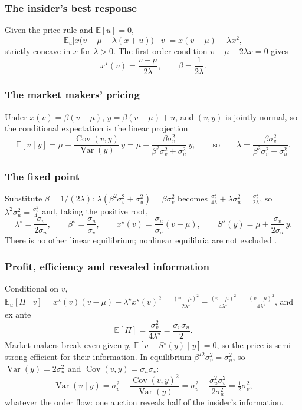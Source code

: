 \subsubsection{The insider's best response}
Given the price rule and $\mathbb{E}[u]=0$,
\[ \mathbb{E}_u\big[x\big(v-\mu-\lambda(x+u)\big)\mid v\big]=x(v-\mu)-\lambda x^2, \]
strictly concave in $x$ for $\lambda>0$. The first-order condition $v-\mu-2\lambda x=0$ gives
\[ x^\star(v)=\frac{v-\mu}{2\lambda},\qquad \beta=\frac{1}{2\lambda}. \]

\subsubsection{The market makers' pricing}
Under $x(v)=\beta(v-\mu)$, $y=\beta(v-\mu)+u$, and $(v,y)$ is jointly normal, so the conditional expectation is the linear projection
\[ \mathbb{E}[v\mid y]=\mu+\frac{\operatorname{Cov}(v,y)}{\operatorname{Var}(y)}\,y=\mu+\frac{\beta\sigma_v^2}{\beta^2\sigma_v^2+\sigma_u^2}\,y,
\qquad\text{so}\qquad \lambda=\frac{\beta\sigma_v^2}{\beta^2\sigma_v^2+\sigma_u^2}. \]

\subsubsection{The fixed point}
Substitute $\beta=1/(2\lambda)$: $\lambda(\beta^2\sigma_v^2+\sigma_u^2)=\beta\sigma_v^2$ becomes $\frac{\sigma_v^2}{4\lambda}+\lambda\sigma_u^2=\frac{\sigma_v^2}{2\lambda}$, so $\lambda^2\sigma_u^2=\frac{\sigma_v^2}{4}$ and, taking the positive root,
\[ \lambda^\star=\frac{\sigma_v}{2\sigma_u},\qquad \beta^\star=\frac{\sigma_u}{\sigma_v},\qquad
x^\star(v)=\frac{\sigma_u}{\sigma_v}(v-\mu),\qquad S^\star(y)=\mu+\frac{\sigma_v}{2\sigma_u}\,y. \]
There is no other linear equilibrium; nonlinear equilibria are not excluded \citep[p.~97]{catalogue-0496}.

\subsubsection{Profit, efficiency and revealed information}
Conditional on $v$, $\mathbb{E}_u[\Pi\mid v]=x^\star(v)(v-\mu)-\lambda^\star x^\star(v)^2=\frac{(v-\mu)^2}{2\lambda^\star}-\frac{(v-\mu)^2}{4\lambda^\star}=\frac{(v-\mu)^2}{4\lambda^\star}$, and ex ante
\[ \mathbb{E}[\Pi]=\frac{\sigma_v^2}{4\lambda^\star}=\frac{\sigma_v\sigma_u}{2}. \]
Market makers break even given $y$, $\mathbb{E}[v-S^\star(y)\mid y]=0$, so the price is semi-strong efficient for their information. In equilibrium $\beta^{\star2}\sigma_v^2=\sigma_u^2$, so $\operatorname{Var}(y)=2\sigma_u^2$ and $\operatorname{Cov}(v,y)=\sigma_u\sigma_v$:
\[ \operatorname{Var}(v\mid y)=\sigma_v^2-\frac{\operatorname{Cov}(v,y)^2}{\operatorname{Var}(y)}=\sigma_v^2-\frac{\sigma_u^2\sigma_v^2}{2\sigma_u^2}=\tfrac12\sigma_v^2, \]
whatever the order flow: one auction reveals half of the insider's information.

